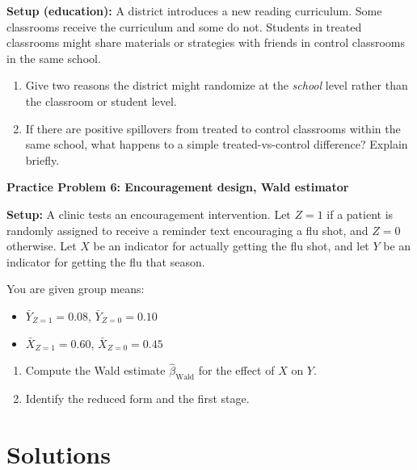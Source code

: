 \documentclass[12pt]{article}
\begin{document}
\noindent \textbf{Setup (education):} A district introduces a new reading curriculum. Some classrooms receive the curriculum and some do not.
Students in treated classrooms might share materials or strategies with friends in control classrooms in the same school.

\begin{enumerate}[label=\arabic*\alph*)]
  \item Give two reasons the district might randomize at the \emph{school} level rather than the classroom or student level.
  \item If there are positive spillovers from treated to control classrooms within the same school, what happens to a simple treated-vs-control difference?
  Explain briefly.
\end{enumerate}


\vspace{1.5em}
\noindent\textbf{Practice Problem 6: Encouragement design, Wald estimator}

\noindent \textbf{Setup:} A clinic tests an encouragement intervention.
Let $Z=1$ if a patient is randomly assigned to receive a reminder text encouraging a flu shot, and $Z=0$ otherwise.
Let $X$ be an indicator for actually getting the flu shot, and let $Y$ be an indicator for getting the flu that season.

You are given group means:
\begin{itemize}
  \item $\bar Y_{Z=1}=0.08$, \quad $\bar Y_{Z=0}=0.10$
  \item $\bar X_{Z=1}=0.60$, \quad $\bar X_{Z=0}=0.45$
\end{itemize}

\begin{enumerate}[label=\arabic*\alph*)]
  \item Compute the Wald estimate $\hat\beta_{\text{Wald}}$ for the effect of $X$ on $Y$.
  \item Identify the reduced form and the first stage.
\end{enumerate}

\newpage
\section*{Solutions}
\end{document}
